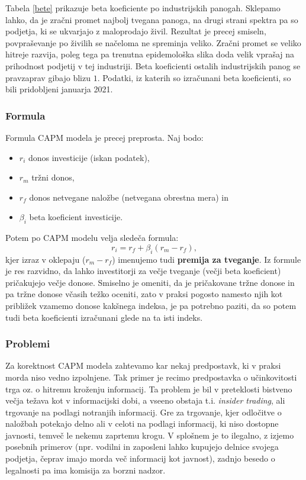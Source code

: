 \documentclass[12pt,a4paper]{amsart}
\theoremstyle{definition} %
\theoremstyle{plain} %
\begin{document}
Tabela \ref{bete} prikazuje beta koeficiente po industrijskih panogah. Sklepamo lahko, da 
je zračni promet najbolj tvegana panoga, na drugi strani spektra pa so podjetja, ki se ukvarjajo 
z maloprodajo živil. Rezultat je precej smiseln, povpraševanje po živilih se načeloma 
ne spreminja veliko. Zračni promet se veliko hitreje razvija, poleg tega pa trenutna
epidemološka slika doda velik vprašaj na prihodnost podjetij v tej industriji. 
Beta koeficienti ostalih industrijskih panog se pravzaprav gibajo blizu $1$. Podatki, iz 
katerih so izračunani beta koeficienti, so bili pridobljeni januarja 2021.


\subsubsection{Formula}
Formula CAPM modela je precej preprosta. Naj bodo:
\begin{itemize}
  \item $r_i$ donos investicije (iskan podatek),
  \item $r_m$ tržni donos,
  \item $r_f$ donos netvegane naložbe (netvegana obrestna mera) in
  \item $\beta_i$ beta koeficient investicije.
\end{itemize}
Potem po CAPM modelu velja sledeča formula:
$$r_i = r_f + \beta_i (r_m - r_f),$$
kjer izraz v oklepaju ($r_m - r_f$) imenujemo tudi \textbf{premija za tveganje}. Iz formule je res
razvidno, da lahko investitorji za večje tveganje (večji beta koeficient) pričakujejo večje donose.
Smiselno je omeniti, da je pričakovane tržne donose in pa tržne donose včasih težko oceniti, zato 
v praksi pogosto namesto njih kot približek vzamemo donose kakšnega indeksa, je pa potrebno 
paziti, da so potem tudi beta koeficienti izračunani glede na ta isti indeks.

\subsubsection{Problemi}
Za korektnost CAPM modela zahtevamo kar nekaj predpostavk, ki v praksi morda niso vedno 
izpolnjene. Tak primer je recimo predpostavka o učinkovitosti trga oz. o hitremu kroženju informacij.
Ta problem je bil v preteklosti bistveno večja težava kot v informacijski dobi, a vseeno obstaja
t.i. \textit{insider trading}, ali trgovanje na podlagi notranjih informacij. Gre za trgovanje, kjer
odločitve o naložbah potekajo delno ali v celoti na podlagi informacij, ki niso dostopne javnosti,
temveč le nekemu zaprtemu krogu. V splošnem je to ilegalno, z izjemo posebnih primerov (npr.
vodilni in zaposleni lahko kupujejo delnice svojega podjetja, čeprav imajo morda več informacij
kot javnost), zadnjo besedo o legalnosti pa ima komisija za borzni nadzor. 
\end{document}

